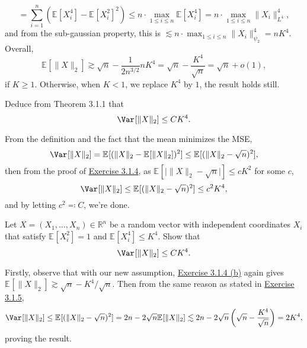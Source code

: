 \begin{answer}
\begin{enumerate}[(a)]
\[			      = \sum_{i=1}^{n} \left( \mathbb{E}_{}[X_i^4] - \mathbb{E}_{}[X_i^2]^2  \right)
			      \leq n \cdot \max _{1 \leq i \leq n} \mathbb{E}_{}[X_i^4]
			      = n \cdot \max _{1 \leq i \leq n} \lVert X_i \rVert _{L^4}^4,
		      \]
		      and from the sub-gaussian property, this is \(\lesssim n \cdot \max _{1 \leq i \leq n} \lVert X_i \rVert _{\psi _2}^4 = n K^4\). Overall,
		      \[
			      \mathbb{E}_{}[\lVert X \rVert _2]
			      \gtrsim \sqrt{n} - \frac{1}{2 n^{3 / 2}} n K^4
			      = \sqrt{n} - \frac{K^4}{\sqrt{n} }
			      = \sqrt{n} + o(1),
		      \]
		      if \(K \geq 1\). Otherwise, when \(K < 1\), we replace \(K^4\) by \(1\), the result holds still.
	\end{enumerate}
\end{answer}

\begin{problem*}[Exercise 3.1.5]\label{ex3.1.5}
	Deduce from Theorem 3.1.1 that
	\[
		\Var_{}[\lVert X \rVert _2]
		\leq CK^4.
	\]
\end{problem*}
\begin{answer}
	From the definition and the fact that the mean minimizes the MSE,
	\[
		\Var_{}[\lVert X \rVert _2]
		= \mathbb{E}_{}[(\lVert X \rVert _2 - \mathbb{E}_{}[\lVert X \rVert _2] )^2]
		\leq \mathbb{E}_{}[(\lVert X \rVert _2 - \sqrt{n} )^2],
	\]
	then from the proof of \hyperref[ex3.1.4]{Exercise 3.1.4}, as \(\mathbb{E}_{}[\vert \lVert X \rVert _2 - \sqrt{n} \vert] \leq c K^2\) for some \(c\),
	\[
		\Var_{}[\lVert X \rVert _2]
		\leq \mathbb{E}_{}[(\lVert X \rVert _2 - \sqrt{n} )^2]
		\leq c^2 K^4,
	\]
	and by letting \(c^2 \eqqcolon C\), we're done.

\end{answer}

\begin{problem*}[Exercise 3.1.6]\label{ex3.1.6}
	Let \(X = (X_1, \dots , X_n) \in \mathbb{R} ^n\) be a random vector with independent coordinates \(X_i\) that satisfy \(\mathbb{E}_{}[X_i^2] = 1\) and \(\mathbb{E}_{}[X_i^4] \leq K^4\). Show that
	\[
		\Var_{}[\lVert X \rVert _2]
		\leq CK^4.
	\]
\end{problem*}
\begin{answer}
	Firstly, observe that with our new assumption, \hyperref[ex3.1.4:b]{Exercise 3.1.4 (b)} again gives \(\mathbb{E}_{}[\lVert X \rVert _2] \gtrsim \sqrt{n} - K^4 / \sqrt{n} \). Then from the same reason as stated in \hyperref[ex3.1.5]{Exercise 3.1.5},
	\[
		\Var_{}[\lVert X \rVert _2]
		\leq \mathbb{E}_{}[(\lVert X \rVert _2 - \sqrt{n} )^2]
		= 2n - 2 \sqrt{n} \mathbb{E}_{}[\lVert X \rVert _2]
		\lesssim 2n - 2 \sqrt{n} \left( \sqrt{n} - \frac{K^4}{\sqrt{n} } \right)
		= 2K^4,
	\]
	proving the result.
\end{answer}

